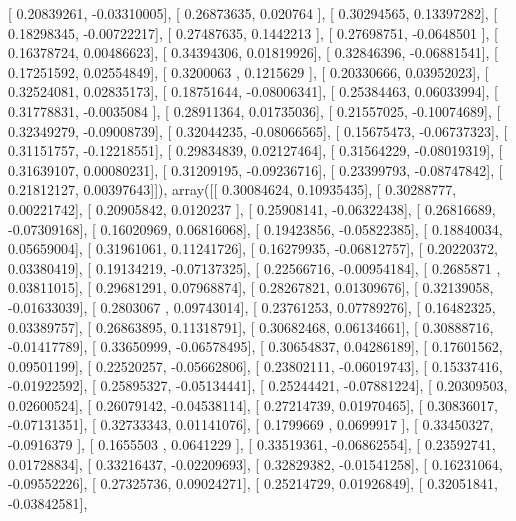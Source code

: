 \documentclass{article}
\begin{document}
       [ 0.20839261, -0.03310005],
       [ 0.26873635,  0.020764  ],
       [ 0.30294565,  0.13397282],
       [ 0.18298345, -0.00722217],
       [ 0.27487635,  0.1442213 ],
       [ 0.27698751, -0.0648501 ],
       [ 0.16378724,  0.00486623],
       [ 0.34394306,  0.01819926],
       [ 0.32846396, -0.06881541],
       [ 0.17251592,  0.02554849],
       [ 0.3200063 ,  0.1215629 ],
       [ 0.20330666,  0.03952023],
       [ 0.32524081,  0.02835173],
       [ 0.18751644, -0.08006341],
       [ 0.25384463,  0.06033994],
       [ 0.31778831, -0.0035084 ],
       [ 0.28911364,  0.01735036],
       [ 0.21557025, -0.10074689],
       [ 0.32349279, -0.09008739],
       [ 0.32044235, -0.08066565],
       [ 0.15675473, -0.06737323],
       [ 0.31151757, -0.12218551],
       [ 0.29834839,  0.02127464],
       [ 0.31564229, -0.08019319],
       [ 0.31639107,  0.00080231],
       [ 0.31209195, -0.09236716],
       [ 0.23399793, -0.08747842],
       [ 0.21812127,  0.00397643]]), array([[ 0.30084624,  0.10935435],
       [ 0.30288777,  0.00221742],
       [ 0.20905842,  0.0120237 ],
       [ 0.25908141, -0.06322438],
       [ 0.26816689, -0.07309168],
       [ 0.16020969,  0.06816068],
       [ 0.19423856, -0.05822385],
       [ 0.18840034,  0.05659004],
       [ 0.31961061,  0.11241726],
       [ 0.16279935, -0.06812757],
       [ 0.20220372,  0.03380419],
       [ 0.19134219, -0.07137325],
       [ 0.22566716, -0.00954184],
       [ 0.2685871 ,  0.03811015],
       [ 0.29681291,  0.07968874],
       [ 0.28267821,  0.01309676],
       [ 0.32139058, -0.01633039],
       [ 0.2803067 ,  0.09743014],
       [ 0.23761253,  0.07789276],
       [ 0.16482325,  0.03389757],
       [ 0.26863895,  0.11318791],
       [ 0.30682468,  0.06134661],
       [ 0.30888716, -0.01417789],
       [ 0.33650999, -0.06578495],
       [ 0.30654837,  0.04286189],
       [ 0.17601562,  0.09501199],
       [ 0.22520257, -0.05662806],
       [ 0.23802111, -0.06019743],
       [ 0.15337416, -0.01922592],
       [ 0.25895327, -0.05134441],
       [ 0.25244421, -0.07881224],
       [ 0.20309503,  0.02600524],
       [ 0.26079142, -0.04538114],
       [ 0.27214739,  0.01970465],
       [ 0.30836017, -0.07131351],
       [ 0.32733343,  0.01141076],
       [ 0.1799669 ,  0.0699917 ],
       [ 0.33450327, -0.0916379 ],
       [ 0.1655503 ,  0.0641229 ],
       [ 0.33519361, -0.06862554],
       [ 0.23592741,  0.01728834],
       [ 0.33216437, -0.02209693],
       [ 0.32829382, -0.01541258],
       [ 0.16231064, -0.09552226],
       [ 0.27325736,  0.09024271],
       [ 0.25214729,  0.01926849],
       [ 0.32051841, -0.03842581],
\end{document}
